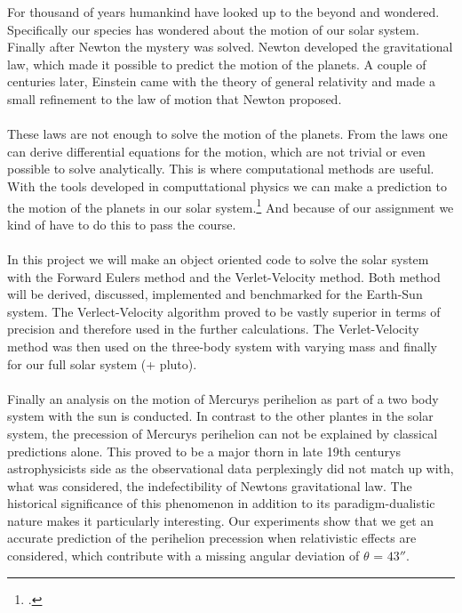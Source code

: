 For thousand of years humankind have looked up to the beyond and wondered. Specifically our species has wondered about the motion of our solar system. Finally after Newton the mystery was solved. Newton developed the gravitational law, which made it possible to predict the motion of the planets. A couple of centuries later, Einstein came with the theory of general relativity and made a small refinement to the law of motion that Newton proposed. 
\\
\\
These laws are not enough to solve the motion of the planets. From the laws one can derive differential equations for the motion, which are not trivial or even possible to solve analytically. This is where computational methods are useful. With the tools developed in computtational physics we can make a prediction to the motion of the planets in our solar system.\footnote{\href{http://www.uio.no/studier/emner/matnat/fys/FYS3150/h17/index.html}{\color{blue}{Semester page for FYS3150 - Autumn 2017}}.} And because of our assignment we kind of have to do this to pass the course.\cite{project3}
\\
\\
In this project we will make an object oriented code to solve the solar system with the Forward Eulers method and the Verlet-Velocity method. Both method will be derived, discussed, implemented and benchmarked for the Earth-Sun system. The Verlect-Velocity algorithm proved to be vastly superior in terms of precision and therefore used in the further calculations. The Verlet-Velocity method was then used on the three-body system with varying mass and finally for our full solar system (+ pluto).
\\
\\
Finally an analysis on the motion of Mercurys perihelion as part of a two body system with the sun is conducted. In contrast to the other plantes in the solar system, the precession of Mercurys perihelion can not be explained by classical predictions alone. This proved to be a major thorn in late 19th centurys astrophysicists side as the observational data perplexingly did not match up with, what was considered, the indefectibility of Newtons gravitational law. The historical significance of this phenomenon in addition to its paradigm-dualistic nature makes it particularly interesting. Our experiments show that we get an accurate prediction of the perihelion precession when relativistic effects are considered, which contribute with a missing angular deviation of $\theta$ = $43''$.